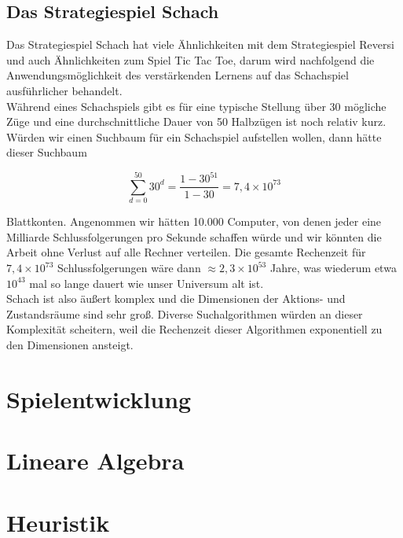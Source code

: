 \subsection{Das Strategiespiel Schach}
Das Strategiespiel Schach hat viele Ähnlichkeiten mit dem Strategiespiel Reversi und auch Ähnlichkeiten zum Spiel Tic Tac Toe, darum wird nachfolgend die  Anwendungsmöglichkeit des verstärkenden Lernens auf das Schachspiel ausführlicher behandelt. \\

Während eines Schachspiels gibt es für eine typische Stellung über 30 mögliche Züge und eine durchschnittliche Dauer von 50 Halbzügen ist noch relativ kurz. Würden wir einen Suchbaum  für ein Schachspiel aufstellen wollen, dann hätte dieser Suchbaum

\begin{equation}
\sum_{d=0}^{50} 30^{d} = \frac{1 - 30^{51}}{1 - 30} = 7,4 \times 10^{73}
\end{equation}

Blattkonten. Angenommen wir hätten 10.000 Computer, von denen jeder eine Milliarde Schlussfolgerungen pro Sekunde schaffen würde und wir könnten die Arbeit ohne Verlust auf alle Rechner verteilen. Die gesamte Rechenzeit für $7,4 \times 10^{73}$ Schlussfolgerungen wäre dann $\approx 2,3 \times 10^{53}$ Jahre, was wiederum etwa $10^{43}$ mal so lange dauert wie unser Universum alt ist\cite[93 \psq]{Ertel}. \\

Schach ist also äußert komplex und die Dimensionen der Aktions- und Zustandsräume sind sehr groß. Diverse Suchalgorithmen würden an dieser Komplexität scheitern, weil die Rechenzeit dieser Algorithmen exponentiell zu den Dimensionen ansteigt. 

\section{Spielentwicklung}

\section{Lineare Algebra}

\section{Heuristik}